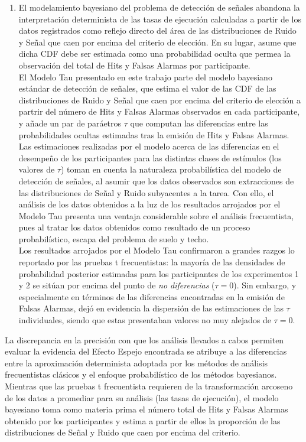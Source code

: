 \begin{enumerate}
\item El modelamiento bayesiano del problema de detección de señales abandona la interpretación determinista de las tasas de ejecución calculadas a partir de los datos registrados como reflejo directo del área de las distribuciones de Ruido y Señal que caen por encima del criterio de elección. En su lugar, asume que dicha CDF debe ser estimada como una probabilidad oculta que permea la observación del total de Hits y Falsas Alarmas por participante.\\

El Modelo Tau presentado en este trabajo parte del modelo bayesiano estándar de detección de señales, que estima el valor de las CDF de las distribuciones de Ruido y Señal que caen por encima del criterio de elección a partrir del número de Hits y Falsas Alarmas observados en cada participante, y añade un par de paráetros $\tau$ que computan las diferencias entre las probabilidades ocultas estimadas tras la emisión de Hits y Falsas Alarmas. Las estimaciones realizadas por el modelo acerca de las diferencias en el desempeño de los participantes para las distintas clases de estímulos (los valores de $\tau$) toman en cuenta la naturaleza probabilística del modelo de detección de señales, al asumir que los datos observados son extracciones de las distribuciones de Señal y Ruido subyacentes a la tarea. Con ello, el análisis de los datos obtenidos a la luz de los resultados arrojados por el Modelo Tau presenta una ventaja considerable sobre el análisis frecuentista, pues al tratar los datos obtenidos como resultado de un proceso probabilístico, escapa del problema de suelo y techo.\\

Los resultados arrojados por el Modelo Tau confirmaron a grandes razgos lo reportado por las pruebas t frecuentistas: la mayoría de las densidades de probabilidad posterior estimadas para los participantes de los experimentos 1 y 2 se sitúan por encima del punto de \textit{no diferencias} ($\tau = 0$). Sin embargo, y especialmente en términos de las diferencias encontradas en la emisión de Falsas Alarmas, dejó en evidencia la dispersión de las estimaciones de las $\tau$ individuales, siendo que estas presentaban valores no muy alejados de $\tau = 0$.\\
\end{enumerate}

La discrepancia en la precisión con que los análisis llevados a cabos permiten evaluar la evidencia del Efecto Espejo encontrada se atribuye a las diferencias entre la aproximación determinista adoptada por los métodos de análisis frecuentistas clásicos y el enfoque probabilístico de los métodos bayesianos. Mientras que las pruebas t frecuentista requieren de la transformación arcoseno de los datos a promediar para su análisis (las tasas de ejecución), el modelo bayesiano toma como materia prima el número total de Hits y Falsas Alarmas obtenido por los participantes y estima a partir de ellos la proporción de las distribuciones de Señal y Ruido que caen por encima del criterio. \\


